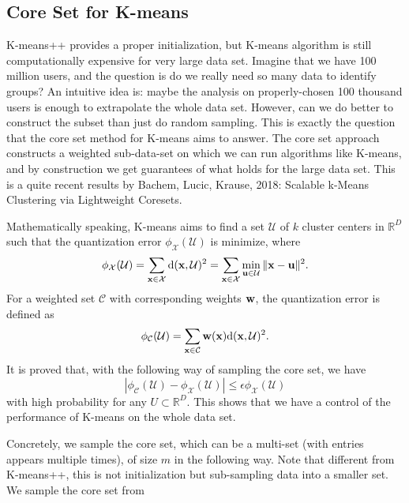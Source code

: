 \documentclass[../main.tex]{subfiles}
\begin{document}
\subsection{Core Set for K-means}
K-means++ provides a proper initialization, but K-means algorithm is still computationally expensive for very large data set. Imagine that we have 100 million users, and the question is do we really need so many data to identify groups? An intuitive idea is: maybe the analysis on properly-chosen 100 thousand users is enough to extrapolate the whole data set. However, can we do better to construct the subset than just do random sampling. This is exactly the question that the core set method for K-means aims to answer. The core set approach constructs a weighted sub-data-set on which we can run algorithms like K-means, and by construction we get guarantees of what holds for the large data set. This is a quite recent results by Bachem, Lucic, Krause, 2018: Scalable k-Means Clustering via Lightweight Coresets.
\par Mathematically speaking, K-means aims to find a set $\mathcal{U}$ of $k$ cluster centers in $\mathbb{R}^D$ such that the quantization error $\phi_{\mathcal{X}}(\mathcal{U})$ is minimize, where
\begin{equation}\label{eq_6_qe}
\phi_{\mathcal{X}}(\mathcal{U}) = \sum_{{\bf x}\in \mathcal{X}}{\rm d}({\bf x}, \mathcal{U})^2=\sum_{{\bf x} \in \mathcal{X}}\min_{{\bf u}\in \mathcal{U}} \|{\bf x-u}\|^2.
\end{equation}
For a weighted set $\mathcal{C}$ with corresponding weights ${\bf w}$, the quantization error is defined as
\begin{equation*}
\phi_{\mathcal{C}}(\mathcal{U}) = \sum_{{\bf x}\in \mathcal{C}}{\bf w}({\bf x}){\rm d}({\bf x},\mathcal{U})^2.
\end{equation*}
It is proved that, with the following way of sampling the core set, we have
\begin{equation}\label{eq_6_epsi_gua}
|\phi_{\mathcal{C}}(\mathcal{U}) - \phi_{\mathcal{X}}(\mathcal{U})|\leq \epsilon \phi_{\mathcal{X}}(\mathcal{U})
\end{equation}
with high probability for any $U \subset \mathbb{R}^D$. This shows that we have a control of the performance of K-means on the whole data set.
\par Concretely, we sample the core set, which can be a multi-set (with entries appears multiple times), of size $m$ in the following way. Note that different from K-means++, this is not initialization but sub-sampling data into a smaller set. We sample the core set from
\end{document}

